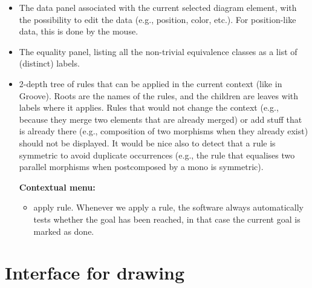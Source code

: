 \documentclass{article}
\begin{document}
\begin{itemize}
    \textbf{Contextual menu}: 
    \begin{itemize}
        \item hide (could apply to all elements of some sort, e.g., you may want to hide all composition witnesses?)
        \item  merge with (and then you have to select another equivalent element, where the panel could restrict to actual possibilites, and hovering would highlight them in the workspace)
        \item  duplicate (and then you have to select dependencies one by one, that must be equivalent to the other ones. The actual possibilities could be highlighted both in the forest and on the workspace)
        \end{itemize}
    \item The data panel associated with the current selected diagram element, with the possibility to edit the data (e.g., position, color, etc.).
    For position-like data, this is done by the mouse.
    \item The equality panel, listing all the non-trivial equivalence classes as a list of (distinct) labels. 
    \item 2-depth tree of rules that can be applied in the current context (like in Groove). Roots are the names of the rules, and the children are leaves with labels where it applies.
     Rules that would not change the context (e.g., because they merge two elements that are already merged) or add stuff that is already there (e.g., composition of two morphisms when they already exist) should not be displayed. It would be nice also to detect that a rule is symmetric to avoid duplicate occurrences (e.g., the rule that equalises two parallel morphisms when postcomposed by a mono is symmetric).
    
    \textbf{Contextual menu:}
    \begin{itemize}
        \item apply rule. Whenever we apply a rule, the software always automatically tests whether the goal has been reached, in that case the current goal is marked as done.
    \end{itemize}
     
    
\end{itemize}
\section{Interface for drawing}
\end{document}
